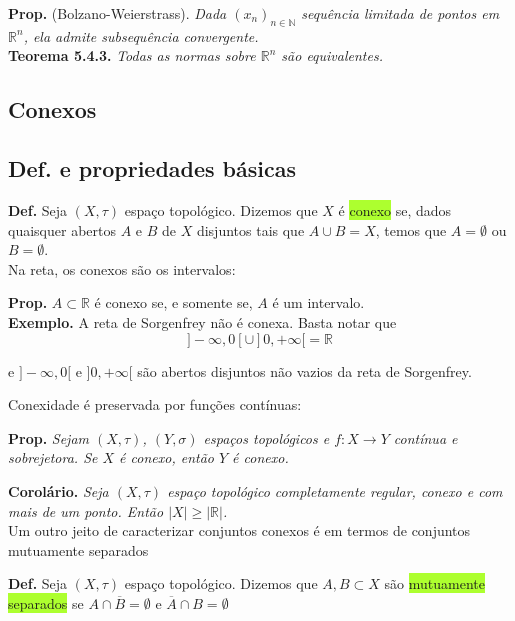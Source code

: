 \documentclass{article}
\begin{document}
\begin{landscape}
\begin{multicols}{3}
\textbf{Prop.} (Bolzano-Weierstrass). \textit{Dada $(x_n)_{n \in \mathbb{N}}$ sequência limitada de pontos em $\mathbb{R}^n$, ela admite subsequência convergente.}\\

\textbf{Teorema 5.4.3.} \textit{Todas as normas sobre $\mathbb{R}^n$ são equivalentes.}
\end{multicols}
\begin{center}
\section{Conexos}
\end{center}
\begin{multicols}{3}
\subsection{Def. e propriedades básicas}
\textbf{Def.} Seja $(X, \tau)$ espaço topológico. Dizemos que $X$ é \colorbox{GreenYellow}{conexo} se, dados quaisquer abertos $A$ e $B$ de $X$ disjuntos tais que $A \cup B = X$, temos que $A = \emptyset$ ou $B = \emptyset$.\\

\color{Emerald} Na reta, os conexos são os intervalos:\color{black}

\textbf{Prop.} $A \subset \mathbb{R}$ é conexo se, e somente se, $A$ é um intervalo.\\

\textbf{Exemplo.} A reta de Sorgenfrey não é conexa. Basta notar que
\[
]-\infty, 0[ \cup ]0, +\infty[ = \mathbb{R}
\]

e $]-\infty, 0[$ e $]0, +\infty[$ são abertos disjuntos não vazios da reta de Sorgenfrey.

\color{Emerald} Conexidade é preservada por funções contínuas:\color{black}

\textbf{Prop.} \textit{Sejam $(X, \tau)$, $(Y, \sigma)$ espaços topológicos e $f : X \to Y$ contínua e sobrejetora. Se $X$ é conexo, então $Y$ é conexo.}

\textbf{Corolário.} \textit{Seja $(X, \tau)$ espaço topológico completamente regular, conexo e com mais de um ponto. Então $|X| \geq |\mathbb{R}|$.}\\

\color{Emerald}Um outro jeito de caracterizar conjuntos conexos é em termos de conjuntos mutuamente separados\color{black}

\textbf{Def.} Seja $(X, \tau)$ espaço topológico. Dizemos que $A, B \subset X$ são \colorbox{GreenYellow}{mutuamente separados} se $A \cap \overline{B} = \emptyset$ e $\overline{A} \cap B = \emptyset$\\


\end{multicols}
\end{landscape}
\end{document}
